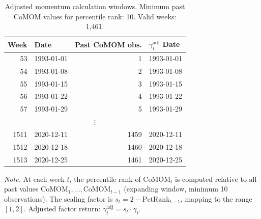 \begin{table}[htbp]
\centering
\caption{Adjusted momentum calculation windows. Minimum past CoMOM values for percentile rank: 10. Valid weeks: 1,461.}
\label{tab:adjmom_calc}
\small
\begin{tabular}{r l r l}
\toprule
    Week & Date & Past CoMOM obs. & $\gamma^{\text{adj}}_t$ Date \\
\midrule
    53 & 1993-01-01 & 1 & 1993-01-01 \\
    54 & 1993-01-08 & 2 & 1993-01-08 \\
    55 & 1993-01-15 & 3 & 1993-01-15 \\
    56 & 1993-01-22 & 4 & 1993-01-22 \\
    57 & 1993-01-29 & 5 & 1993-01-29 \\
    \multicolumn{4}{c}{$\vdots$} \\
    1511 & 2020-12-11 & 1459 & 2020-12-11 \\
    1512 & 2020-12-18 & 1460 & 2020-12-18 \\
    1513 & 2020-12-25 & 1461 & 2020-12-25 \\
\bottomrule
\end{tabular}
\vspace{4pt}
\begin{flushleft}
\footnotesize
\textit{Note.} At each week $t$, the percentile rank of $\text{CoMOM}_t$ is computed relative to all past values $\text{CoMOM}_{1}, \ldots, \text{CoMOM}_{t-1}$ (expanding window, minimum 10 observations). The scaling factor is $s_t = 2 - \text{PctRank}_{t-1}$, mapping to the range $[1, 2]$. Adjusted factor return: $\gamma^{\text{adj}}_t = s_t \cdot \gamma_t$.
\end{flushleft}
\end{table}
